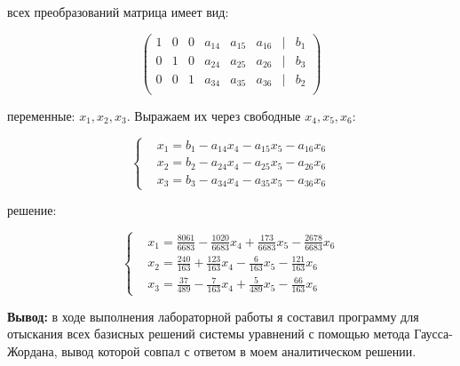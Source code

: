 \documentclass{report}
\begin{document}
\begin{itemize}
				 всех преобразований матрица имеет вид:
			
			\begin{center}
				\Large{
					\[
					\begin{pmatrix}
						1 & 0 & 0 & a_{14} & a_{15} & a_{16} & | & b_{1} \\
						0 & 1 & 0 & a_{24} & a_{25} & a_{26} & | & b_{3} \\
						0 & 0 & 1 & a_{34} & a_{35} & a_{36} & | & b_{2} \\
					\end{pmatrix}
					\]
				}
			\end{center}
			
			
			 переменные: $x_1, x_2, x_3$. Выражаем их через свободные $x_4, x_5, x_6$:
			
			\[
			\left\{
			\begin{aligned}
				&x_1 = b_1 - a_{14}x_4 - a_{15}x_5 - a_{16}x_6 \\
				&x_2 = b_2 - a_{24}x_4 - a_{25}x_5 - a_{26}x_6 \\
				&x_3 = b_3 - a_{34}x_4 - a_{35}x_5 - a_{36}x_6
			\end{aligned}
			\right.
			\]
			
			
			 решение:
			
			\[
			\left\{
			\begin{aligned}
				&x_1 = \frac{8061}{6683} - \frac{1020}{6683}x_4 + \frac{173}{6683}x_5 - \frac{2678}{6683}x_6 \\
				&x_2 = \frac{240}{163} + \frac{123}{163}x_4 - \frac{6}{163}x_5 - \frac{121}{163}x_6 \\
				&x_3 = \frac{37}{489} - \frac{7}{163}x_4 + \frac{5}{489}x_5 - \frac{66}{163}x_6
			\end{aligned}
			\right.
			\]

		

\end{itemize}

	
	
	
	
	
	
	
	
	
	
	\textbf{Вывод: }в ходе выполнения лабораторной работы я составил программу для отыскания всех базисных решений системы уравнений с помощью метода Гаусса-Жордана, вывод которой совпал с  ответом в моем аналитическом решении.
\end{document}

